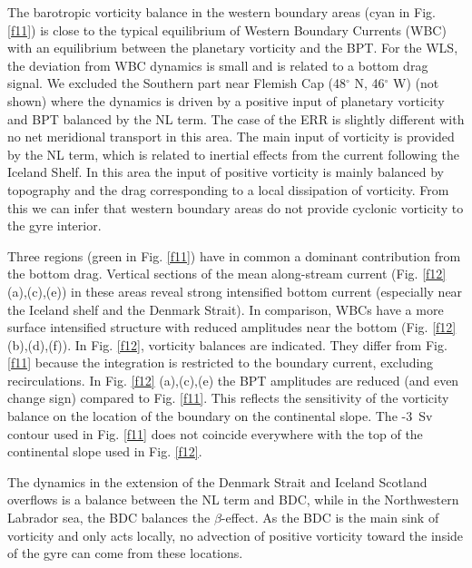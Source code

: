 \documentclass[os, manuscript]{copernicus}
\begin{document}
The barotropic vorticity balance in the western boundary areas (cyan in Fig. \ref{f11}) is close to the typical equilibrium of Western Boundary Currents (WBC) \citep{schoonover2016,gula2015} with an equilibrium between the planetary vorticity and the BPT. For the WLS, the deviation from WBC dynamics is small and is related to a bottom drag signal. We excluded the Southern part near Flemish Cap (48$^{\circ}$ N, 46$^{\circ}$ W) (not shown) where the dynamics is driven by a positive input of planetary vorticity and BPT balanced by the NL term. The case of the ERR is slightly different with  no net meridional transport in this area. The main input of vorticity is provided by the NL term, which is related to inertial effects from the current following the Iceland Shelf. In this area the input of positive vorticity is mainly balanced by topography and the drag corresponding to a local dissipation of vorticity. From this we can infer that western boundary areas do not provide cyclonic vorticity to the gyre interior.

Three regions (green in Fig. \ref{f11}) have in common a dominant contribution from the bottom drag. Vertical sections of the mean along-stream current (Fig. \ref{f12} (a),(c),(e)) in these areas reveal strong intensified bottom current (especially near the Iceland shelf and the Denmark Strait). In comparison, WBCs have a more surface intensified structure with reduced amplitudes near the bottom (Fig. \ref{f12} (b),(d),(f)). In Fig. \ref{f12}, vorticity balances are indicated. They differ from Fig. \ref{f11} because the integration is restricted to the boundary current, excluding recirculations. In Fig. \ref{f12} (a),(c),(e) the BPT amplitudes are reduced (and even change sign) compared to Fig. \ref{f11}. This reflects the sensitivity of the vorticity balance on the location of the boundary on the continental slope. The -3~Sv contour used in Fig. \ref{f11} does not coincide everywhere with the top of the continental slope used in Fig. \ref{f12}. 

The dynamics in the extension of the Denmark Strait and Iceland Scotland overflows is a balance between the NL term and BDC, while in the Northwestern Labrador sea, the BDC balances the $\beta$-effect. As the BDC is the main sink of vorticity and only acts locally, no advection of positive vorticity toward the inside of the gyre can come from these locations.
\end{document}

